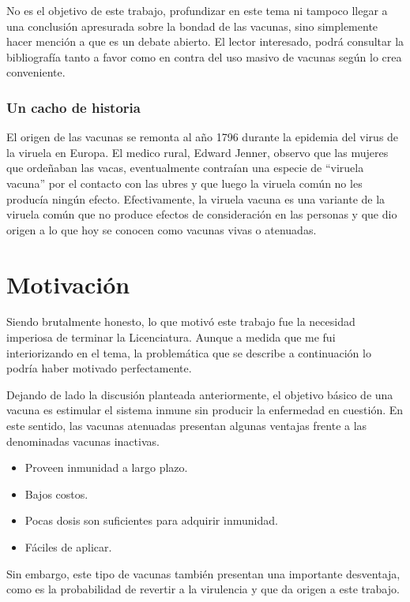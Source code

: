 No es el objetivo de este trabajo, profundizar en este tema ni tampoco llegar a
una conclusi\'on apresurada sobre la bondad de las vacunas, sino simplemente
hacer menci\'on a que es un debate abierto. El lector interesado, podr\'a
consultar la bibliograf\'ia tanto a favor como en contra del uso
masivo de vacunas seg\'un lo crea conveniente.

\subsubsection{Un cacho de historia}

El origen de las vacunas se remonta al a\~no 1796 durante la epidemia del virus
de la viruela en Europa. El medico rural, Edward Jenner, observo que las
mujeres que orde\~naban las vacas, eventualmente contra\'ian una especie de
``viruela vacuna'' por el contacto con las ubres y que luego la viruela com\'un
no les produc\'ia ning\'un efecto. Efectivamente, la viruela vacuna es una
variante de la viruela com\'un que no produce efectos de consideraci\'on en las
personas y que dio origen a lo que hoy se conocen como vacunas vivas o
atenuadas.

\section{Motivaci\'on}
\label{motivacion}
Siendo brutalmente honesto, lo que motiv\'o este trabajo fue la necesidad
imperiosa de terminar la Licenciatura. Aunque a medida que me fui
interiorizando en el tema, la problem\'atica que se describe a continuaci\'on lo
podr\'ia haber motivado perfectamente.

Dejando de lado la discusi\'on planteada anteriormente, el objetivo b\'asico de
una vacuna es estimular el sistema inmune sin producir la enfermedad en
cuesti\'on. En este sentido, las vacunas atenuadas presentan algunas ventajas
frente a las denominadas vacunas inactivas.
\begin{itemize}
 \item Proveen inmunidad a largo plazo.
 \item Bajos costos.
 \item Pocas dosis son suficientes para adquirir inmunidad. 
 \item F\'aciles de aplicar.
\end{itemize}

Sin embargo, este tipo de vacunas tambi\'en presentan una importante desventaja,
como es la probabilidad de revertir a la virulencia y que da origen a este
trabajo.

